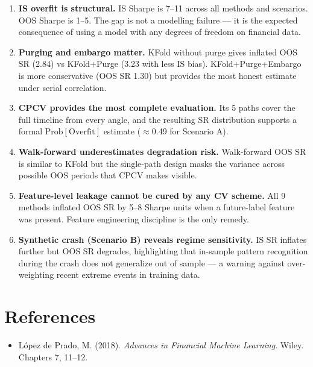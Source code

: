 \documentclass[11pt,a4paper]{article}
\newcommand{\PBO}{\mathrm{Prob[Overfit]}}
\begin{document}
\begin{enumerate}
  \item \textbf{IS overfit is structural.}  IS Sharpe is 7--11 across all
    methods and scenarios.  OOS Sharpe is 1--5.  The gap is not a modelling
    failure --- it is the expected consequence of using a model with any
    degrees of freedom on financial data.

  \item \textbf{Purging and embargo matter.}  KFold without purge gives inflated
    OOS SR (2.84) vs KFold+Purge (3.23 with less IS bias).
    KFold+Purge+Embargo is more conservative (OOS SR 1.30) but provides the
    most honest estimate under serial correlation.

  \item \textbf{CPCV provides the most complete evaluation.}  Its 5 paths cover
    the full timeline from every angle, and the resulting SR distribution
    supports a formal $\PBO$ estimate ($\approx$0.49 for Scenario A).

  \item \textbf{Walk-forward underestimates degradation risk.}  Walk-forward
    OOS SR is similar to KFold but the single-path design masks the variance
    across possible OOS periods that CPCV makes visible.

  \item \textbf{Feature-level leakage cannot be cured by any CV scheme.}
    All 9 methods inflated OOS SR by 5--8 Sharpe units when a future-label
    feature was present.  Feature engineering discipline is the only remedy.

  \item \textbf{Synthetic crash (Scenario B) reveals regime sensitivity.}
    IS SR inflates further but OOS SR degrades, highlighting that in-sample
    pattern recognition during the crash does not generalize out of sample ---
    a warning against over-weighting recent extreme events in training data.
\end{enumerate}

\section*{References}

\begin{itemize}
  \item L\'opez de Prado, M. (2018). \emph{Advances in Financial Machine
    Learning}. Wiley. Chapters 7, 11--12.
\end{itemize}
\end{document}
